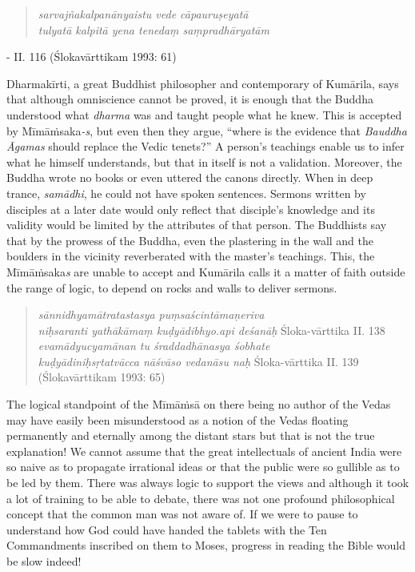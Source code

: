 \vspace{-.3cm}

\begin{verse}
\textit{sarvajñakalpanānyaistu vede cāpauruṣeyatā }\\\textit{tulyatā kalpitā yena tenedaṃ saṃpradhāryatām } 
\end{verse}

\vspace{-.4cm}

\begin{flushright}
- II. 116 (Ślokavārttikam 1993: 61)
\end{flushright}

Dharmakīrti, a great Buddhist philosopher and contemporary of Kumārila, says that although omniscience cannot be proved, it is enough that the Buddha understood what \textit{dharma} was and taught people what he knew. This is accepted by Mīmāṁsaka\textit{-s}, but even then they argue, “where is the evidence that \textit{Bauddha Āgamas} should replace the Vedic tenets?” A person’s teachings enable us to infer what he himself understands, but that in itself is not a validation. Moreover, the Buddha wrote no books or even uttered the canons directly. When in deep trance, \textit{samādhi}, he could not have spoken sentences. Sermons written by disciples at a later date would only reflect that disciple’s knowledge and its validity would be limited by the attributes of that person. The Buddhists say that by the prowess of the Buddha, even the plastering in the wall and the boulders in the vicinity reverberated with the master’s teachings. This, the Mīmāṁsaka\textit{s} are unable to accept and Kumārila calls it a matter of faith outside the range of logic, to depend on rocks and walls to deliver sermons.

\begin{verse}
\textit{sānnidhyamātratastasya puṃsaścintāmaṇeriva }\\\textit{niḥsaranti yathākāmaṃ kuḍyādibhyo.api deśanāḥ } Śloka-vārttika II. 138\\\textit{evamādyucyamānan tu śraddadhānasya śobhate }\\\textit{kuḍyādiniḥsṛtatvācca nāśvāso vedanāsu naḥ } Śloka-vārttika II. 139 (Ślokavārttikam 1993: 65)
\end{verse}

The logical standpoint of the Mīmāṁsā on there being no author of the Vedas may have easily been misunderstood as a notion of the Vedas floating permanently and eternally among the distant stars but that is not the true explanation! We cannot assume that the great intellectuals of ancient India were so naive as to propagate irrational ideas or that the public were so gullible as to be led by them. There was always logic to support the views and although it took a lot of training to be able to debate, there was not one profound philosophical concept that the common man was not aware of. If we were to pause to understand how God could have handed the tablets with the Ten Commandments inscribed on them to Moses, progress in reading the Bible would be slow indeed!


